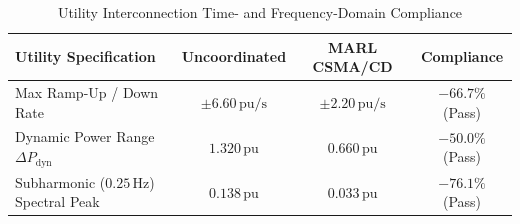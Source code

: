\documentclass[11pt,fleqn]{article}
\begin{document}
\begin{table}[t]
\centering
\caption{Utility Interconnection Time- and Frequency-Domain Compliance}
\label{tab:utility_specs}
\scriptsize
\setlength{\tabcolsep}{2.4pt}
\renewcommand{\arraystretch}{1.15}
\begin{tabular}{@{}lccc@{}}
\toprule
\textbf{Utility Specification} & \textbf{Uncoordinated} & \textbf{MARL CSMA/CD} & \textbf{Compliance} \\
\midrule
Max Ramp-Up / Down Rate & $\pm 6.60\,\mathrm{pu/s}$ & $\pm 2.20\,\mathrm{pu/s}$ & $\mathbf{-66.7\%}$ (Pass) \\
Dynamic Power Range $\Delta P_{\mathrm{dyn}}$ & $1.320\,\mathrm{pu}$ & $0.660\,\mathrm{pu}$ & $\mathbf{-50.0\%}$ (Pass) \\
Subharmonic ($0.25\,\mathrm{Hz}$) Spectral Peak & $0.138\,\mathrm{pu}$ & $0.033\,\mathrm{pu}$ & $\mathbf{-76.1\%}$ (Pass) \\
\bottomrule
\end{tabular}
\end{table}
\end{document}
